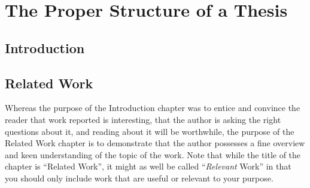 \documentclass[ twoside,openright,titlepage,numbers=noenddot,headinclude,%
                footinclude=true,cleardoublepage=empty,abstractoff, %
                BCOR=5mm,paper=a4,fontsize=11pt,%
                ngerman,american,%
                ]{scrreprt}
\begin{document}
\frenchspacing
\raggedbottom
{} %
\pagestyle{plain}



\cleardoublepage
\cleardoublepage
\cleardoublepage
\pagestyle{scrheadings}
\cleardoublepage
\cleardoublepage{}
\cleardoublepage

\part{The Proper Structure of a Thesis}
\label{part:prop-struct-thes}
\cleardoublepage

\chapter{Introduction}\label{ch:introduction}


\chapter{Related Work}
\label{cha:related-work}

Whereas the purpose of the Introduction chapter was to entice and
convince the reader that work reported is interesting, that the author
is asking the right questions about it, and reading about it will be
worthwhile, the purpose of the Related Work chapter is to
demonstrate that the author possesses a fine overview and keen
understanding of the topic of the work.  Note that while the title of
the chapter is ``Related Work'', it might as well be called
``\emph{Relevant} Work'' in that you should only include work that are
useful or relevant to your purpose. 
\end{document}
